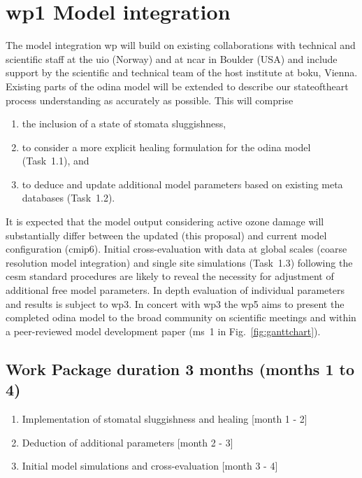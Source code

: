 \section{\gls{wp}1 Model integration}
\label{sec:wp1}
The model integration \gls{wp} will build on existing collaborations with technical and scientific staff at the \gls{uio} (Norway) and at \gls{ncar} in Boulder (USA) and include support by the scientific and technical team of the host institute at \gls{boku}, Vienna. Existing parts of the \gls{odina} model will be extended to describe our stateoftheart process understanding as accurately as possible. This will comprise
\begin{enumerate}
  \itemsep0pt
\item the inclusion of a state of stomata sluggishness,
\item to  consider a more explicit healing formulation for the \gls{odina} model (Task~1.1),  and
\item to deduce and update additional model parameters based on existing meta databases (Task~1.2).
\end{enumerate}
It is expected that the model output considering  active ozone damage will substantially differ between the updated (this proposal) and current model configuration (\gls{cmip}6). Initial cross-evaluation with data at global scales (coarse resolution model integration) and single site simulations (Task~1.3) following the \gls{cesm} standard procedures are likely to reveal the necessity for adjustment of additional free model parameters. In depth evaluation of individual parameters and results is subject to \gls{wp}3. In concert with \gls{wp}3 the \gls{wp}5 aims to present the  completed \gls{odina} model to the broad community on scientific meetings and within  a peer-reviewed model development paper (\gls{ms}~1 in Fig.~\ref{fig:ganttchart}).
\subsection*{Work Package duration 3 months (months 1 to 4)}
\begin{enumerate}[start=1,label={T1.\arabic*}]
  \itemsep0pt
\item Implementation of stomatal sluggishness and healing \hfill [month 1 - 2]
\item Deduction of additional parameters \hfill [month 2 - 3]
\item Initial model simulations and cross-evaluation \hfill [month 3 - 4]
\end{enumerate}


